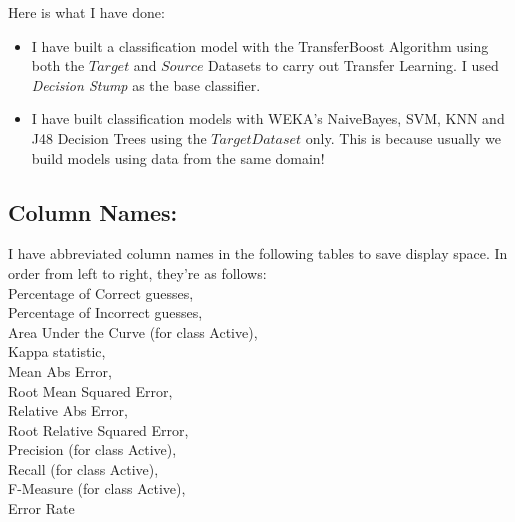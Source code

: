 \documentclass[a4paper,12pt, english]{article}
\begin{document}
Here is what I have done:
\begin{itemize}
\item I have built a classification model with the TransferBoost Algorithm using both the $Target$ and $Source$ Datasets to carry out Transfer Learning. I used \emph{Decision Stump} as the base classifier.
\item I have built classification models with WEKA's NaiveBayes, SVM, KNN and J48 Decision Trees using the $Target Dataset$ only. This is because usually we build models using data from the same domain!
\end{itemize}

\subsection{Column Names:}
I have abbreviated column names in the following tables to save display space. In order from left to right, they're as follows:\\
Percentage of Correct guesses,\\
Percentage of Incorrect guesses,\\
Area Under the Curve (for class Active),\\
Kappa statistic,\\
Mean Abs Error,\\
Root Mean Squared Error,\\
Relative Abs Error,\\
Root Relative Squared Error,\\
Precision (for class Active),\\
Recall (for class Active),\\
F-Measure (for class Active),\\
Error Rate\\
\end{document}
